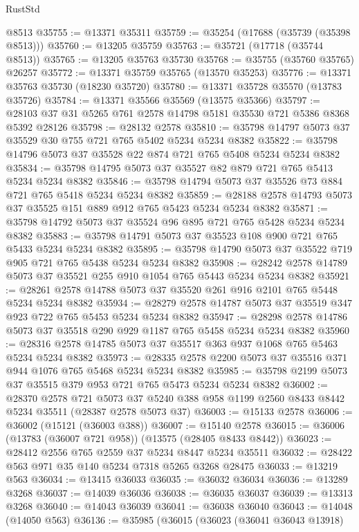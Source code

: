\begin{lexlean}{RustStd}
\begin{coremodule}
    @8513
@35755 := @13371 @35311
@35759 := @35254 (@17688 (@35739 (@35398 @8513)))
@35760 := @13205 @35759
@35763 := @35721 (@17718 (@35744 @8513))
@35765 := @13205 @35763 @35730
@35768 := @35755 (@35760 @35765) @26257
@35772 := @13371 @35759 @35765 (@13570 @35253)
@35776 := @13371 @35763 @35730 (@18230 @35720)
@35780 := @13371 @35728 @35570 (@13783 @35726)
@35784 := @13371 @35566 @35569 (@13575 @35366)
@35797 := @28103 @37 @31 @5265 @761 @2578 @14798 @5181 @35530 @721 @5386 @8368 @5392 @28126
@35798 := @28132 @2578
@35810 := @35798 @14797 @5073 @37 @35529 @30 @755 @721 @765 @5402 @5234 @5234 @8382
@35822 := @35798 @14796 @5073 @37 @35528 @22 @874 @721 @765 @5408 @5234 @5234 @8382
@35834 := @35798 @14795 @5073 @37 @35527 @82 @879 @721 @765 @5413 @5234 @5234 @8382
@35846 := @35798 @14794 @5073 @37 @35526 @73 @884 @721 @765 @5418 @5234 @5234 @8382
@35859 := @28188 @2578 @14793 @5073 @37 @35525 @151 @889 @912 @765 @5423 @5234 @5234 @8382
@35871 := @35798 @14792 @5073 @37 @35524 @96 @895 @721 @765 @5428 @5234 @5234 @8382
@35883 := @35798 @14791 @5073 @37 @35523 @108 @900 @721 @765 @5433 @5234 @5234 @8382
@35895 := @35798 @14790 @5073 @37 @35522 @719 @905 @721 @765 @5438 @5234 @5234 @8382
@35908 := @28242 @2578 @14789 @5073 @37 @35521 @255 @910 @1054 @765 @5443 @5234 @5234 @8382
@35921 := @28261 @2578 @14788 @5073 @37 @35520 @261 @916 @2101 @765 @5448 @5234 @5234 @8382
@35934 := @28279 @2578 @14787 @5073 @37 @35519 @347 @923 @722 @765 @5453 @5234 @5234 @8382
@35947 := @28298 @2578 @14786 @5073 @37 @35518 @290 @929 @1187 @765 @5458 @5234 @5234 @8382
@35960 := @28316 @2578 @14785 @5073 @37 @35517 @363 @937 @1068 @765 @5463 @5234 @5234 @8382
@35973 := @28335 @2578 @2200 @5073 @37 @35516 @371 @944 @1076 @765 @5468 @5234 @5234 @8382
@35985 := @35798 @2199 @5073 @37 @35515 @379 @953 @721 @765 @5473 @5234 @5234 @8382
@36002 := @28370
    @2578
    @721
    @5073
    @37
    @5240
    @388
    @958
    @1199
    @2560
    @8433
    @8442
    @5234
    @35511
    (@28387 @2578 @5073 @37)
@36003 := @15133 @2578
@36006 := @36002 (@15121 (@36003 @388))
@36007 := @15140 @2578
@36015 := @36006 (@13783 (@36007 @721 @958)) (@13575 (@28405 @8433 @8442))
@36023 := @28412 @2556 @765 @2559 @37 @5234 @8447 @5234 @35511
@36032 := @28422 @563 @971 @35 @140 @5234 @7318 @5265 @3268 @28475
@36033 := @13219 @563
@36034 := @13415 @36033
@36035 := @36032 @36034
@36036 := @13289 @3268
@36037 := @14039 @36036
@36038 := @36035 @36037
@36039 := @13313 @3268
@36040 := @14043 @36039
@36041 := @36038 @36040
@36043 := @14048 (@14050 @563)
@36136 := @35985
    (@36015
      (@36023
        (@36041 @36043 @13918)

\end{coremodule}
\end{lexlean}
